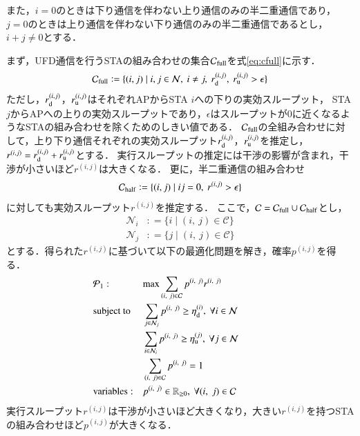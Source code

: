 \documentclass[master]{kuisthesis}		%
\newcommand{\sij}{(i,j)}
\newcommand{\pij}{p^{(i,j)}}
\newcommand{\rd}{r^{\sij}_{\rm d}}
\newcommand{\ru}{r^{\sij}_{\rm u}}
\newcommand{\rij}{r^{\sij}}
\def\equiv{\mathrel{\mathop:}=}
\begin{document}
			また，$i=0$のときは下り通信を伴わない上り通信のみの半二重通信であり，
			$j=0$のときは上り通信を伴わない下り通信のみの半二重通信であるとし，
			$i+j\neq0$とする．
			\par
			まず，UFD通信を行うSTAの組み合わせの集合${\mathcal C}_{\rm full}$を式\eqref{eq:cfull}に示す．
			\begin{equation}
				{\mathcal C}_{\rm full} \equiv \{\sij\mid i,j\in{\mathcal N},\ i\neq j,\ r^{\sij}_{\rm d},\ r^{\sij}_{\rm u}>\epsilon\} \label{eq:cfull}
			\end{equation}
			ただし，$r_{\rm d}^{\sij}$，$r_{\rm u}^{\sij}$はそれぞれAPからSTA $i$への下りの実効スループット，
			STA $j$からAPへの上りの実効スループットであり，$\epsilon$はスループットが0に近くなるようなSTAの組み合わせを除くためのしきい値である．
			${\mathcal C}_{\rm full}$の全組み合わせに対して，上り下り通信それぞれの実効スループット$\rd$，$\ru$を推定し，$\rij=\rd + \ru$とする．
			実行スループットの推定には干渉の影響が含まれ，干渉が小さいほど$\rij$は大きくなる．
			更に，半二重通信の組み合わせ
			\begin{equation}
				{\mathcal C}_{\rm half} \equiv \{\sij\mid ij=0,\ \rij >\epsilon\}
			\end{equation}
			に対しても実効スループット$\rij$を推定する．
			ここで，${\mathcal C} = {\mathcal C}_{\rm full} \cup {\mathcal C}_{\rm half}$とし，
			\begin{align}
				{\mathcal N}_i &\equiv \{i\mid(i,\ j)\in{\mathcal C}\}\\
				{\mathcal N}_j &\equiv \{j\mid(i,\ j)\in{\mathcal C}\}
			\end{align}
			とする．得られた$\rij$に基づいて以下の最適化問題を解き，確率$\pij$を得る．
			\begin{align}
				&{\mathcal P}_1: && {\rm max} \sum_{(i,\ j)\in{\mathcal C}} p^{(i,\ j)}r^{(i,\ j)} &&&&&& \label{eq:p1}\\
				&{\rm subject\ to} && \sum_{j\in{\mathcal N}_j} p^{(i,\ j)} \geq \eta_{\rm d}^{(i)},\ \forall i\in {\mathcal N} \label{eq:pd} \\
				&&& \sum_{i\in{\mathcal N}_i} p^{(i,\ j)} \geq \eta_{\rm u}^{(j)},\ \forall j\in {\mathcal N} \label{eq:pu}\\
				&&& \sum_{(i,\ j)\in{\mathcal C}} p^{(i,\ j)}=1 \\
				&{\rm variables:} &&p^{(i,\ j)} \in {\mathbb R}_{\geq 0},\ \forall(i,\ j)\in {\mathcal C} \nonumber
			\end{align}
			実行スループット$\rij$は干渉が小さいほど大きくなり，大きい$\rij$を持つSTAの組み合わせほど$p^{\sij}$が大きくなる．
\end{document}
